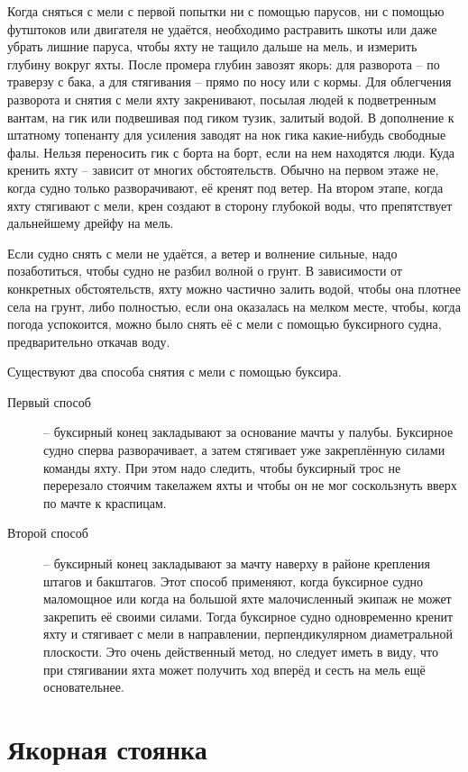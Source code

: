 Когда сняться с мели с первой попытки ни с помощью парусов, ни с помощью футштоков или двигателя не удаётся, необходимо растравить шкоты или даже убрать лишние паруса, чтобы яхту не тащило дальше на мель, и измерить глубину вокруг яхты. После промера глубин завозят якорь: для разворота \--- по траверзу с бака, а для стягивания \--- прямо по носу или с кормы. Для облегчения разворота и снятия с мели яхту закренивают, посылая людей к подветренным вантам, на гик или подвешивая под гиком тузик, залитый водой. В дополнение к штатному топенанту для усиления заводят на нок гика какие-нибудь свободные фалы. Нельзя переносить гик с борта на борт, если на нем находятся люди. Куда кренить яхту \--- зависит от многих обстоятельств. Обычно на первом этаже не, когда судно только разворачивают, её кренят под ветер. На втором этапе, когда яхту стягивают с мели, крен создают в сторону глубокой воды, что препятствует дальнейшему дрейфу на мель.

Если судно снять с мели не удаётся, а ветер и волнение сильные, надо позаботиться, чтобы судно не разбил волной о грунт. В зависимости от конкретных обстоятельств, яхту можно частично залить водой, чтобы она плотнее села на грунт, либо полностью, если она оказалась на мелком месте, чтобы, когда погода успокоится, можно было снять её с мели с помощью буксирного судна, предварительно откачав воду.

Существуют два способа снятия с мели с помощью буксира.
\begin{description}
\item[Первый способ] \--- буксирный конец закладывают за основание мачты у палубы. Буксирное судно сперва разворачивает, а затем стягивает уже закреплённую силами команды яхту. При этом надо следить, чтобы буксирный трос не перерезало стоячим такелажем яхты и чтобы он не мог соскользнуть вверх по мачте к краспицам.
\item[Второй способ] \--- буксирный конец закладывают за мачту наверху в районе крепления штагов и бакштагов. Этот способ применяют, когда буксирное судно маломощное или когда на большой яхте малочисленный экипаж не может закрепить её своими силами. Тогда буксирное судно одновременно кренит яхту и стягивает с мели в направлении, перпендикулярном диаметральной плоскости. Это очень действенный метод, но следует иметь в виду, что при стягивании яхта может получить ход вперёд и сесть на мель ещё основательнее.
\end{description}

\section{Якорная стоянка}

